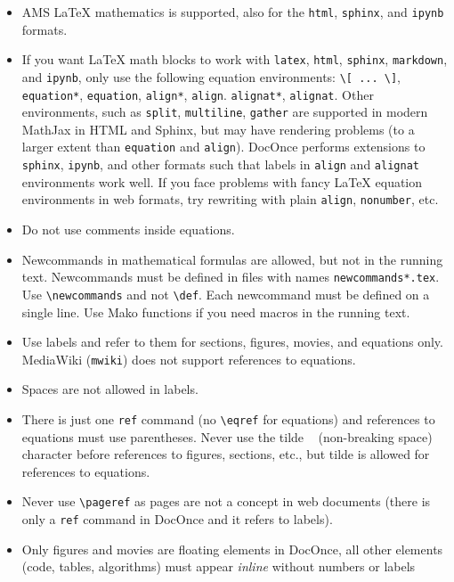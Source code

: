 \documentclass[%
oneside,                 %
final,                   %
10pt]{article}
\begin{document}
\begin{itemize}
 \item AMS {\LaTeX} mathematics is supported, also for the \texttt{html}, \texttt{sphinx},
   and \texttt{ipynb} formats.
 \item If you want {\LaTeX} math blocks to work with \texttt{latex}, \texttt{html}, \texttt{sphinx},
   \texttt{markdown}, and \texttt{ipynb}, only use
   the following equation environments: \Verb!\[ ... \]!,
   \texttt{equation*}, \texttt{equation}, \texttt{align*}, \texttt{align}. \texttt{alignat*}, \texttt{alignat}.
   Other environments, such as \texttt{split}, \texttt{multiline}, \texttt{gather} are
   supported in modern MathJax in HTML and Sphinx, but may have
   rendering problems (to a larger extent than \texttt{equation} and \texttt{align}).
   DocOnce performs extensions to \texttt{sphinx}, \texttt{ipynb},
   and other formats such that
   labels in \texttt{align} and \texttt{alignat} environments work well.
   If you face problems with fancy {\LaTeX} equation environments in
   web formats, try rewriting with plain \texttt{align}, \texttt{nonumber}, etc.
 \item Do not use comments inside equations.
 \item Newcommands in mathematical formulas are allowed, but not in
   the running text. Newcommands must be defined in files with names
   \texttt{newcommands*.tex}. Use \Verb!\newcommands! and not \Verb!\def!.
   Each newcommand must be defined on a single line.
   Use Mako functions if you need macros in the running text.
 \item Use labels and refer to them
   for sections, figures, movies, and equations only.
   MediaWiki (\texttt{mwiki}) does not support references to equations.
 \item Spaces are not allowed in labels.
 \item There is just one \texttt{ref} command (no \Verb!\eqref! for equations) and references to
   equations must use parentheses. Never use the tilde \texttt{~} (non-breaking
   space) character before references to figures, sections, etc., but
   tilde is allowed for references to equations.
 \item Never use \Verb!\pageref! as pages are not a concept in web documents
   (there is only a \texttt{ref} command in DocOnce and it refers to labels).
 \item Only figures and movies are floating elements in DocOnce, all other elements
   (code, tables, algorithms) must appear \emph{inline} without numbers or labels

\end{itemize}
\end{document}
